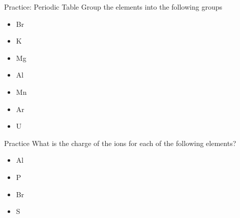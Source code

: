 \documentclass[11pt]{beamer}
\begin{document}
\begin{frame}{Practice: Periodic Table}
  Group the elements into the following groups
  \begin{itemize}
  \item Br
  \item K
  \item Mg
  \item Al
  \item Mn
  \item Ar
  \item U
  \end{itemize}
\end{frame}

\begin{frame}{Practice}
  What is the charge of the ions for each of the following elements?

  \begin{itemize}
  \item Al
  \item P
  \item Br
  \item S
  \end{itemize}
\end{frame}
\end{document}
